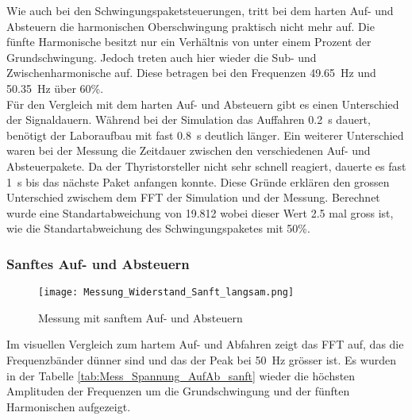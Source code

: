 Wie auch bei den Schwingungspaketsteuerungen, tritt bei dem harten Auf- und Absteuern die harmonischen Oberschwingung praktisch nicht mehr auf. Die fünfte Harmonische besitzt nur ein Verhältnis von unter einem Prozent der Grundschwingung. Jedoch treten auch hier wieder die Sub- und Zwischenharmonische auf. Diese betragen bei den Frequenzen \SI{49.65}{Hz} und \SI{50.35}{Hz} über 60\%. \\
Für den Vergleich mit dem harten Auf- und Absteuern gibt es einen Unterschied der Signaldauern. Während bei der Simulation das Auffahren \SI{0.2}{s} dauert, benötigt der Laboraufbau mit fast \SI{0.8}{s} deutlich länger. Ein weiterer Unterschied waren bei der Messung die Zeitdauer zwischen den verschiedenen Auf- und Absteuerpakete. Da der Thyristorsteller nicht sehr schnell reagiert, dauerte es fast \SI{1}{s} bis das nächste Paket anfangen konnte. Diese Gründe erklären den grossen Unterschied zwischem dem FFT der Simulation und der Messung. Berechnet wurde eine Standartabweichung von 19.812 wobei dieser Wert 2.5 mal gross ist, wie die Standartabweichung des Schwingungspaketes mit 50\%.



\newpage
\subsubsection*{Sanftes Auf- und Absteuern}
\begin{figure}[ht!]
	\centering
	\texttt{[image: Messung\_Widerstand\_Sanft\_langsam.png]}	
	\caption{Messung mit sanftem Auf- und Absteuern}\label{fig:Mess_Sanft_langsam}
\end{figure}

Im visuellen Vergleich zum hartem Auf- und Abfahren zeigt das FFT auf, das die Frequenzbänder dünner sind und das der Peak bei \SI{50}{Hz} grösser ist. Es wurden in der Tabelle \ref{tab:Mess_Spannung_AufAb_sanft} wieder die höchsten Amplituden der Frequenzen um die Grundschwingung und der fünften Harmonischen aufgezeigt. 

